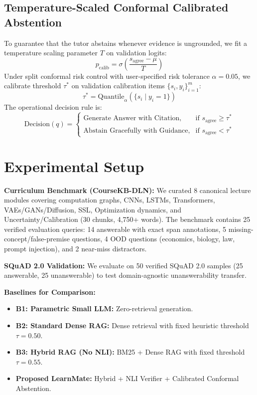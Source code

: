 \documentclass[10pt,twocolumn,letterpaper]{article}
\begin{document}
\subsection{Temperature-Scaled Conformal Calibrated Abstention}
To guarantee that the tutor abstains whenever evidence is ungrounded, we fit a temperature scaling parameter $T$ on validation logits:
\begin{equation}
    p_{\text{calib}} = \sigma \left( \frac{s_{\text{agree}} - \mu}{T} \right)
\end{equation}
Under split conformal risk control with user-specified risk tolerance $\alpha = 0.05$, we calibrate threshold $\tau^*$ on validation calibration items $\{s_i, y_i\}_{i=1}^m$:
\begin{equation}
    \tau^* = \text{Quantile}_{\alpha} \left( \{ s_i \mid y_i = 1 \} \right)
\end{equation}
The operational decision rule is:
\begin{equation}
    \text{Decision}(q) = \begin{cases} 
        \text{Generate Answer with Citation}, & \text{if } s_{\text{agree}} \ge \tau^* \\
        \text{Abstain Gracefully with Guidance}, & \text{if } s_{\text{agree}} < \tau^* 
    \end{cases}
\end{equation}

\section{Experimental Setup}
\noindent \textbf{Curriculum Benchmark (CourseKB-DLN):} We curated 8 canonical lecture modules covering computation graphs, CNNs, LSTMs, Transformers, VAEs/GANs/Diffusion, SSL, Optimization dynamics, and Uncertainty/Calibration (30 chunks, 4,750+ words). The benchmark contains 25 verified evaluation queries: 14 answerable with exact span annotations, 5 missing-concept/false-premise questions, 4 OOD questions (economics, biology, law, prompt injection), and 2 near-miss distractors.

\noindent \textbf{SQuAD 2.0 Validation:} We evaluate on 50 verified SQuAD 2.0 samples (25 answerable, 25 unanswerable) to test domain-agnostic unanswerability transfer.

\noindent \textbf{Baselines for Comparison:}
\begin{itemize}
    \item \textbf{B1: Parametric Small LLM:} Zero-retrieval generation.
    \item \textbf{B2: Standard Dense RAG:} Dense retrieval with fixed heuristic threshold $\tau = 0.50$.
    \item \textbf{B3: Hybrid RAG (No NLI):} BM25 + Dense RAG with fixed threshold $\tau = 0.55$.
    \item \textbf{Proposed LearnMate:} Hybrid + NLI Verifier + Calibrated Conformal Abstention.
\end{itemize}
\end{document}
